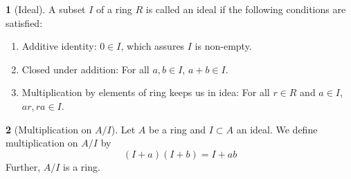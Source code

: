 \documentclass[12pt]{article}
\theoremstyle{definition}
\newtheorem{definition}{\color{NavyBlue}{\textbf{Definition}}}
\begin{document}
\begin{definition}[Ideal]
A subset $I$ of a ring $R$ is called an ideal if the following conditions are satisfied:
\begin{enumerate}
\item Additive identity: $0 \in I$, which assures $I$ is non-empty.
\item Closed under addition: For all $a,b \in I$, $a+b \in I$.
\item Multiplication by elements of ring keeps us in idea: For all $r \in R$ and $a \in I$, $ar, ra \in I$.
\end{enumerate}
\end{definition}

\begin{definition}[Multiplication on $A/I$]
Let $A$ be a ring and $I \subset A$ an ideal. We define multiplication on $A/I$ by
\begin{equation}
(I+a)(I+b) = I + ab
\end{equation}
Further, $A/I$ is a ring.
\end{definition}
\end{document}
